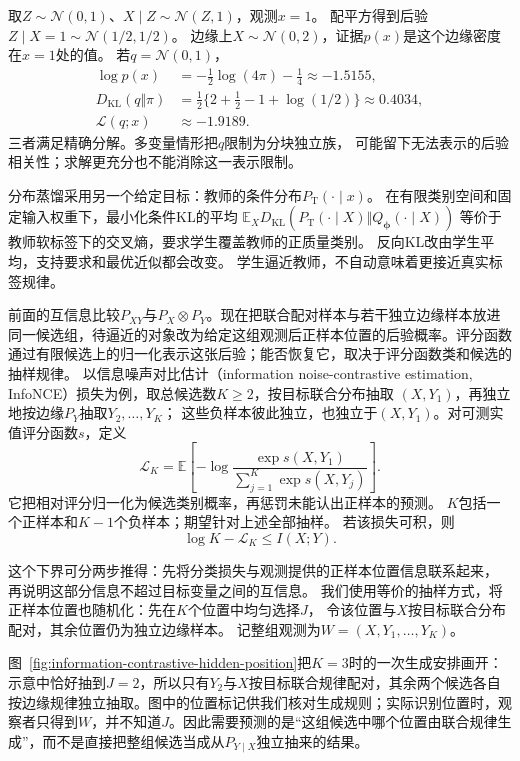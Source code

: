 取\(Z\sim\mathcal N(0,1)\)、\(X\mid Z\sim\mathcal N(Z,1)\)，观测\(x=1\)。
配平方得到后验\(Z\mid X=1\sim\mathcal N(1/2,1/2)\)。
边缘上\(X\sim\mathcal N(0,2)\)，证据\(p(x)\)是这个边缘密度在\(x=1\)处的值。
若\(q=\mathcal N(0,1)\)，
\[
\begin{aligned}
  \log p(x)&=-\tfrac12\log(4\pi)-\tfrac14\approx-1.5155,\\
  D_{\mathrm{KL}}(q\Vert\pi)
  &=\tfrac12\{2+\tfrac12-1+\log(1/2)\}\approx0.4034,\\
  \mathcal L(q;x)&\approx-1.9189.
\end{aligned}
\]
三者满足精确分解。多变量情形把\(q\)限制为分块独立族，
可能留下无法表示的后验相关性；求解更充分也不能消除这一表示限制。

分布蒸馏采用另一个给定目标：教师的条件分布\(P_{\mathrm T}(\cdot\mid x)\)。
在有限类别空间和固定输入权重下，最小化条件KL的平均
\(\mathbb E_XD_{\mathrm{KL}}(P_{\mathrm T}(\cdot\mid X)\Vert Q_{\bm\phi}(\cdot\mid X))\)
等价于教师软标签下的交叉熵，要求学生覆盖教师的正质量类别。
反向KL改由学生平均，支持要求和最优近似都会改变。
学生逼近教师，不自动意味着更接近真实标签规律。

前面的互信息比较\(P_{XY}\)与\(P_X\otimes P_Y\)。现在把联合配对样本与若干独立边缘样本放进同一候选组，待逼近的对象改为给定这组观测后正样本位置的后验概率。评分函数通过有限候选上的归一化表示这张后验；能否恢复它，取决于评分函数类和候选的抽样规律。
以信息噪声对比估计（information noise-contrastive estimation, InfoNCE）损失为例，取总候选数\(K\geq2\)，按目标联合分布抽取
\((X,Y_1)\)，再独立地按边缘\(P_Y\)抽取\(Y_2,\ldots,Y_K\)；
这些负样本彼此独立，也独立于\((X,Y_1)\)。对可测实值评分函数\(s\)，定义
\begin{equation}
 \mathcal L_K
 =\mathbb E\left[-\log
   \frac{\exp s(X,Y_1)}{\sum_{j=1}^K\exp s(X,Y_j)}\right].
 \label{eq:information-contrastive-loss}
\end{equation}
它把相对评分归一化为候选类别概率，再惩罚未能认出正样本的预测。
\(K\)包括一个正样本和\(K-1\)个负样本；期望针对上述全部抽样。
若该损失可积，则
\[
 \log K-\mathcal L_K\leq I(X;Y).
\]

这个下界可分两步推得：先将分类损失与观测提供的正样本位置信息联系起来，
再说明这部分信息不超过目标变量之间的互信息。
我们使用等价的抽样方式，将正样本位置也随机化：先在\(K\)个位置中均匀选择\(J\)，
令该位置与\(X\)按目标联合分布配对，其余位置仍为独立边缘样本。
记整组观测为\(W=(X,Y_1,\ldots,Y_K)\)。

图~\ref{fig:information-contrastive-hidden-position}把\(K=3\)时的一次生成安排画开：示意中恰好抽到\(J=2\)，所以只有\(Y_2\)与\(X\)按目标联合规律配对，其余两个候选各自按边缘规律独立抽取。图中的位置标记供我们核对生成规则；实际识别位置时，观察者只得到\(W\)，并不知道\(J\)。因此需要预测的是“这组候选中哪个位置由联合规律生成”，而不是直接把整组候选当成从\(P_{Y\mid X}\)独立抽来的结果。

